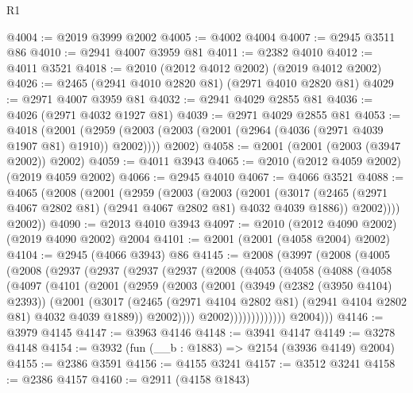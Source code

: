 \begin{lexlean}{R1}
\begin{coremodule}
@4004 := @2019 @3999 @2002
@4005 := @4002 @4004
@4007 := @2945 @3511 @86
@4010 := @2941 @4007 @3959 @81
@4011 := @2382 @4010
@4012 := @4011 @3521
@4018 := @2010 (@2012 @4012 @2002) (@2019 @4012 @2002)
@4026 := @2465 (@2941 @4010 @2820 @81) (@2971 @4010 @2820 @81)
@4029 := @2971 @4007 @3959 @81
@4032 := @2941 @4029 @2855 @81
@4036 := @4026 (@2971 @4032 @1927 @81)
@4039 := @2971 @4029 @2855 @81
@4053 := @4018
    (@2001
      (@2959 (@2003 (@2003 (@2001 (@2964 (@4036 (@2971 @4039 @1907 @81) @1910)) @2002))))
      @2002)
@4058 := @2001 (@2001 (@2003 (@3947 @2002)) @2002)
@4059 := @4011 @3943
@4065 := @2010 (@2012 @4059 @2002) (@2019 @4059 @2002)
@4066 := @2945 @4010
@4067 := @4066 @3521
@4088 := @4065
    (@2008
      (@2001
        (@2959
          (@2003
            (@2003
              (@2001
                (@3017 (@2465 (@2971 @4067 @2802 @81) (@2941 @4067 @2802 @81) @4032 @4039 @1886))
                @2002))))
        @2002))
@4090 := @2013 @4010 @3943
@4097 := @2010 (@2012 @4090 @2002) (@2019 @4090 @2002) @2004
@4101 := @2001 (@2001 (@4058 @2004) @2002)
@4104 := @2945 (@4066 @3943) @86
@4145 := @2008
    (@3997
      (@2008
        (@4005
          (@2008
            (@2937
              (@2937
                (@2937
                  (@2937
                    (@2008
                      (@4053
                        (@4058
                          (@4088
                            (@4058
                              (@4097
                                (@4101
                                  (@2001
                                    (@2959
                                      (@2003
                                        (@2001
                                          (@3949 (@2382 (@3950 @4104) @2393))
                                          (@2001
                                            (@3017
                                              (@2465
                                                (@2971 @4104 @2802 @81)
                                                (@2941 @4104 @2802 @81)
                                                @4032
                                                @4039
                                                @1889))
                                            @2002))))
                                    @2002)))))))))))))
          @2004)))
@4146 := @3979 @4145
@4147 := @3963 @4146
@4148 := @3941 @4147
@4149 := @3278 @4148
@4154 := @3932 (fun (__b : @1883) => @2154 (@3936 @4149) @2004)
@4155 := @2386 @3591
@4156 := @4155 @3241
@4157 := @3512 @3241
@4158 := @2386 @4157
@4160 := @2911 (@4158 @1843)

\end{coremodule}
\end{lexlean}
